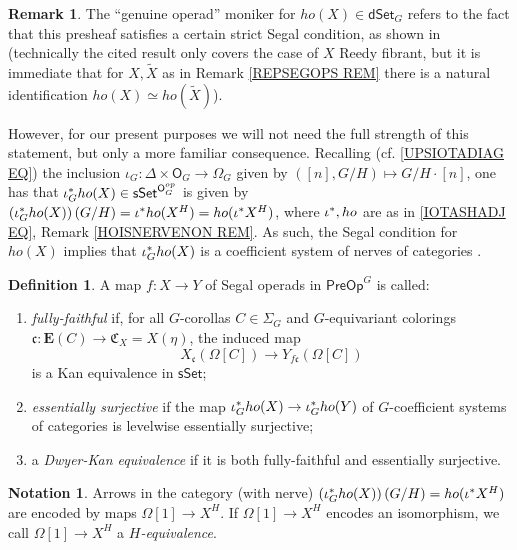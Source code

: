 \documentclass[a4paper,10pt
,draft
]{article}%
\numberwithin{equation}{section}
\numberwithin{figure}{section}
\theoremstyle{definition} %
\newtheorem{definition}[equation]{Definition}%
\newtheorem{remark}[equation]{Remark}%
\newtheorem{notation}[equation]{Notation}%
\newcommand{\dSet}{\mathsf{dSet}}
\newcommand{\1}{\ensuremath{\mathbbm 1}}%
\begin{document}
\begin{remark}
	The ``genuine operad'' moniker for 
	$ho(X)\in \dSet_G$ refers to the fact that this presheaf satisfies a certain strict Segal condition, as shown in \cite[Prop. 5.9]{BP_edss}
	(technically the cited result only covers the case of $X$ Reedy fibrant, but it is immediate that for 
	$X,\widetilde{X}$ as in
	Remark \ref{REPSEGOPS REM} 
	there is a natural identification 
	$ho(X) \simeq ho(\widetilde{X})$).

	However, for our present purposes we will not need the full strength of this statement, 
	but only a more familiar consequence.
	Recalling 
	(cf. \eqref{UPSIOTADIAG EQ})
	the inclusion
	$\iota_G \colon \Delta \times \mathsf{O}_G \to \Omega_G$
	given by 
	$([n],G/H) \mapsto G/H \cdot [n]$,
	one has that
	$\iota_G^{\**}ho(X)
	\in \mathsf{sSet}^{\mathsf{O}_G^{op}}$
	is given by
	$\left(\iota_G^{\**}ho(X)\right)(G/H)
	= \iota^{\**} ho(X^H) = 
	ho(\iota^{\**} X^H)$,
	where $\iota^{\**},ho$ are as in
	\eqref{IOTASHADJ EQ},
	Remark \ref{HOISNERVENON REM}.
%
	As such, the Segal condition for $ho(X)$ implies that 
	$\iota_G^{\**}ho(X)$
	is a coefficient system of 
	nerves of categories \cite[Rem. 5.11]{BP_edss}.
\end{remark}


\begin{definition}\label{DKEQUIV DEF}
      A map $f \colon X \to Y$ of Segal operads in $\mathsf{PreOp}^G$ is called:
\begin{enumerate}[label = (\roman*)]
	\item \textit{fully-faithful} if,
	for all $G$-corollas $C \in \Sigma_G$ 
	and $G$-equivariant colorings
	$\mathfrak{c} \colon \boldsymbol{E}(C) \to
	\mathfrak{C}_X = X(\eta)$,
	the induced map
\[
	X_{\mathfrak{c}}(\Omega[C]) \to 
	Y_{f\mathfrak{c}}(\Omega[C])
\]
	is a Kan equivalence in $\mathsf{sSet}$;
	\item \textit{essentially surjective} if the map 
      $\iota_G^{\**}ho(X) \to \iota_G^{\**}ho(Y)$ of $G$-coefficient systems of categories
      is levelwise essentially surjective;
	\item a \textit{Dwyer-Kan equivalence} if it is both fully-faithful and essentially surjective.
      \end{enumerate}
\end{definition}



\begin{notation}\label{HEQUIV NOT}
	Arrows in the category (with nerve)
	$\left(\iota_G^{\**}ho(X)\right)(G/H)
	= ho(\iota^{\**}X^H)$
	are encoded by maps
	$\Omega[1] \to X^H$.
	If $\Omega[1] \to X^H$
	encodes an isomorphism,
	we call $\Omega[1] \to X^H$
	a \emph{$H$-equivalence}.
\end{notation}
\end{document}
